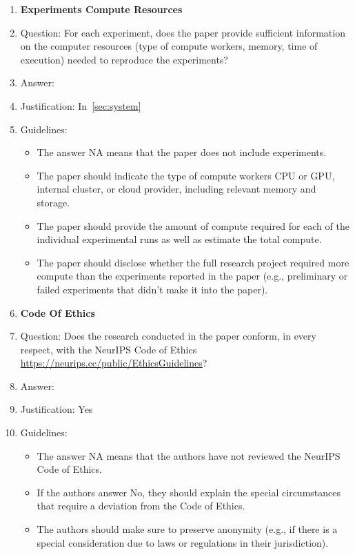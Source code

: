\documentclass{article}
\begin{document}
{\begin{enumerate}
\item {\bf Experiments Compute Resources}
    \item[] Question: For each experiment, does the paper provide sufficient information on the computer resources (type of compute workers, memory, time of execution) needed to reproduce the experiments?
    \item[] Answer: \answerYes{} %
    \item[] Justification: In~\cref{sec:system}
    \item[] Guidelines:
    \begin{itemize}
        \item The answer NA means that the paper does not include experiments.
        \item The paper should indicate the type of compute workers CPU or GPU, internal cluster, or cloud provider, including relevant memory and storage.
        \item The paper should provide the amount of compute required for each of the individual experimental runs as well as estimate the total compute.
        \item The paper should disclose whether the full research project required more compute than the experiments reported in the paper (e.g., preliminary or failed experiments that didn't make it into the paper).
    \end{itemize}

\item {\bf Code Of Ethics}
    \item[] Question: Does the research conducted in the paper conform, in every respect, with the NeurIPS Code of Ethics \url{https://neurips.cc/public/EthicsGuidelines}?
    \item[] Answer: \answerYes{} %
    \item[] Justification: Yes
    \item[] Guidelines:
    \begin{itemize}
        \item The answer NA means that the authors have not reviewed the NeurIPS Code of Ethics.
        \item If the authors answer No, they should explain the special circumstances that require a deviation from the Code of Ethics.
        \item The authors should make sure to preserve anonymity (e.g., if there is a special consideration due to laws or regulations in their jurisdiction).
    \end{itemize}



\end{enumerate}}
\end{document}
